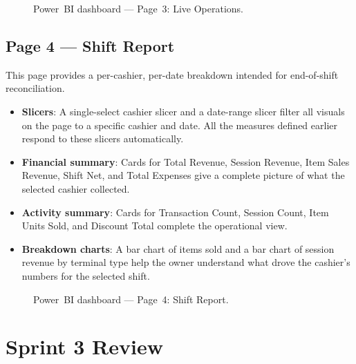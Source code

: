 \begin{figure}[H]
  \centering
  \caption{Power~BI dashboard --- Page~3: Live Operations.}
  \label{fig:pbi_page3}
\end{figure}

\subsection{Page 4 — Shift Report}

This page provides a per-cashier, per-date breakdown intended for end-of-shift
reconciliation.

\begin{itemize}
  \item \textbf{Slicers}: A single-select cashier slicer and a date-range slicer
        filter all visuals on the page to a specific cashier and date. All the
        measures defined earlier respond to these slicers automatically.
  \item \textbf{Financial summary}: Cards for Total Revenue, Session Revenue, Item
        Sales Revenue, Shift Net, and Total Expenses give a complete picture of what
        the selected cashier collected.
  \item \textbf{Activity summary}: Cards for Transaction Count, Session Count, Item
        Units Sold, and Discount Total complete the operational view.
  \item \textbf{Breakdown charts}: A bar chart of items sold and a bar chart of
        session revenue by terminal type help the owner understand what drove the
        cashier's numbers for the selected shift.
\end{itemize}

\begin{figure}[H]
  \centering
  \caption{Power~BI dashboard --- Page~4: Shift Report.}
  \label{fig:pbi_page4}
\end{figure}

\section{Sprint 3 Review}

